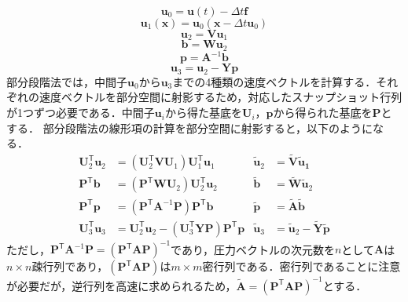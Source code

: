 \documentclass[a4j,12pt]{jreport}
\begin{document}
\[
	\bm{u}_0 =  \bm{u} (t)  - \varDelta t \bm{f} 	
\]
\[
	\bm{u}_1(\bm{x}) = \bm{u}_0(\bm{x}  - \varDelta t \bm{u}_0)
\]
\[
	\bm{u}_2   =  \bm{V}\bm{u}_1
\]
\[
	\bm{b} = \bm{W}\bm{u}_2
\]
\[
	\bm{p} = \bm{A}^{-1}\bm{b}
\]
\[
	\bm{u}_3  =  \bm{u}_2 - \bm{Y}\bm{p} 
\]
部分段階法では，中間子$\bm{u}_0$から$\bm{u}_3$までの4種類の速度ベクトルを計算する．それぞれの速度ベクトルを部分空間に射影するため，対応したスナップショット行列が1つずつ必要である．中間子$\bm{u}_i$から得た基底を$\bm{U}_i$，$\bm{p}$から得られた基底を$\bm{P}$とする．
部分段階法の線形項の計算を部分空間に射影すると，以下のようになる．
\begin{align*}
 \bm{U}_2^{\mathsf T}\bm{u}_2	& = (\bm{U}_2^{\mathsf T}\bm{V}\bm{U}_1)\bm{U}_1^{\mathsf T}\bm{u}_1 					&\bm{\widetilde{u}}_2 		&= \bm{\widetilde{V}}\bm{\widetilde{u}_1}	\\
 \bm{P}^{\mathsf T}\bm{b}		& = (\bm{P}^{\mathsf T}\bm{W}\bm{U}_2)\bm{U}_2^{\mathsf T}\bm{u}_2        				&\bm{\widetilde{b}}			&= \bm{\widetilde{W}}\bm{\widetilde{u}}_2	\\
 \bm{P}^{\mathsf T}\bm{p} 		&= (\bm{P}^{\mathsf T}\bm{A}^{-1}\bm{P})\bm{P}^{\mathsf T}\bm{b}						&\bm{\widetilde{p}}			&= \bm{\widetilde{A}}\bm{\widetilde{b}}\\
 \bm{U}_3^{\mathsf T}\bm{u}_3 	&=  \bm{U}_2^{\mathsf T}\bm{u}_2 - (\bm{U}_3^{\mathsf T}\bm{Y}\bm{P})\bm{P}^{\mathsf T}\bm{p}	&\bm{\widetilde{u}}_3		&= \bm{\widetilde{u}}_2  -  \bm{\widetilde{Y}}\bm{\widetilde{p}}
\end{align*}
ただし，$\bm{P}^{\mathsf T}\bm{A}^{-1}\bm{P} = (\bm{P}^{\mathsf T}\bm{A}\bm{P})^{-1}$であり，圧力ベクトルの次元数を$n$として$\bm{A}$は$n\times n$疎行列であり，$(\bm{P}^{\mathsf T}\bm{A}\bm{P})$は$m\times m$密行列である．密行列であることに注意が必要だが，逆行列を高速に求められるため，$\bm{\widetilde{A}} = (\bm{P}^{\mathsf T}\bm{A}\bm{P})^{-1}$とする．
\end{document}
